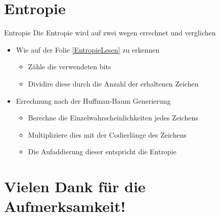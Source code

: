 \documentclass{beamer}
\begin{document}
\section{Entropie}
\begin{frame}{Entropie}
Die Entropie wird auf zwei wegen errechnet und verglichen
\begin{itemize}
	\item Wie auf der Folie \ref*{EntropieLesen} zu erkennen
	\begin{itemize}
	\item Zähle die verwendeten bits
	\item Dividire diese durch die Anzahl der erhaltenen Zeichen
	\end{itemize}
	
	\item Errechnung nach der Huffman-Baum Generierung
	\begin{itemize}
	\item Berechne die Einzelwahrscheinlichkeiten jedes Zeichens
	\item Multipliziere dies mit der Codierlänge des Zeichens
	\item Die Aufaddierung dieser entspricht die Entropie
	\end{itemize}
\end{itemize}
\end{frame}

\section*{Vielen Dank für die Aufmerksamkeit!}
  
\end{document}
